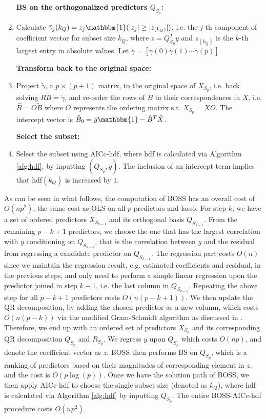\begin{algorithm}
\begin{enumerate}[label=\arabic*.]
		\textbf{BS on the orthogonalized predictors $Q_{S_{p}}$:}

		\item Calculate $\tilde{\gamma}_j (k_Q)= z_j \mathbbm{1}(|z_j| \ge |z_{(k_Q)}|)$, i.e. the $j$-th component of coefficient vector for subset size $k_Q$, where $z=Q_{S_p}^T y$ and $z_{(k_Q)}$ is the $k$-th largest entry in absolute values. Let $\tilde{\gamma} = [\tilde{\gamma} (0) \tilde{\gamma} (1) \cdots \tilde{\gamma} (p)]$.
		
		\textbf{Transform back to the original space:}

		\item Project $\tilde{\gamma}$, a $p \times (p+1)$ matrix, to the original space of $X_{S_p}$, i.e. back solving $R \tilde{B} = \tilde{\gamma}$, and re-order the rows of $\tilde{B}$ to their correspondences in $X$, i.e. $\hat{B} = O \tilde{B}$ where $O$ represents the ordering matrix s.t. $X_{S_p}=XO$. The intercept vector is $\hat{B}_0 = \bar{y} \mathbbm{1} - \hat{B}^T \bar{X}$. 

		\textbf{Select the subset:}

		\item Select the subset using AICc-hdf, where hdf is calculated via Algorithm \ref{alg:hdf}, by inputting $(Q_{S_p},y)$. The inclusion of an intercept term implies that hdf$(k_Q)$ is increased by $1$.
	\end{enumerate}
\end{algorithm}


As can be seen in what follows, the computation of BOSS has an overall cost of $O(np^2)$, the same cost as OLS on all $p$ predictors and lasso. For step $k$, we have a set of ordered predictors $X_{S_{k-1}}$ and its orthogonal basis $Q_{S_{k-1}}$. From the remaining $p-k+1$ predictors, we choose the one that has the largest correlation with $y$ conditioning on $Q_{S_{k-1}}$, that is the correlation between $y$ and the residual from regressing a candidate predictor on $Q_{S_{k-1}}$. The regression part costs $O(n)$ since we maintain the regression result, e.g. estimated coefficients and residual, in the previous steps, and only need to perform a simple linear regression upon the predictor joined in step $k-1$, i.e. the last column in $Q_{S_{k-1}}$. Repeating the above step for all $p-k+1$ predictors costs $O(n(p-k+1))$. We then update the QR decomposition, by adding the chosen predictor as a new column, which costs $O(n(p-k))$ via the modified Gram-Schmidt algorithm as discussed in \citet{hammarling2008updating}. Therefore, we end up with an ordered set of predictors $X_{S_p}$ and its corresponding QR decomposition $Q_{S_p}$ and $R_{S_p}$. We regress $y$ upon $Q_{S_p}$ which costs $O(np)$, and denote the coefficient vector as $z$. BOSS then performs BS on $Q_{S_p}$, which is a ranking of predictors based on their magnitudes of corresponding element in $z$, and the cost is $O(p\log(p))$. Once we have the solution path of BOSS, we then apply AICc-hdf to choose the single subset size (denoted as $k_Q$), where hdf is calculated via Algorithm \ref{alg:hdf} by inputting $Q_{S_p}$. The entire BOSS-AICc-hdf procedure costs $O(np^2)$. 

